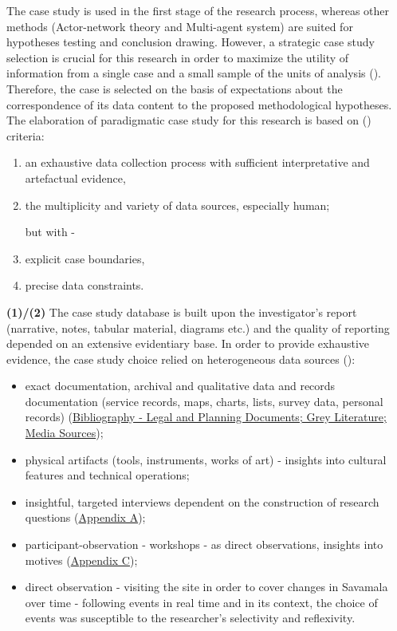 \documentclass[11pt]{report}
\begin{document}
The case study is used in the first stage of the research process, whereas other methods (Actor-network theory and Multi-agent system) are suited for hypotheses testing and conclusion drawing. However, a strategic case study selection is crucial for this research in order to maximize the utility of information from a single case and a small sample of the units of analysis  (\href{Flyvbjerg}{\citealt{flyvbjerg_five_2006}}).
Therefore, the case is selected on the basis of expectations about the correspondence of its data content to the proposed methodological hypotheses. The elaboration of paradigmatic case study for this research is based on (\href{Yin}{\citealt{yin_case_2009}}) criteria:

\begin{enumerate}
\item an exhaustive data collection process with sufficient interpretative and artefactual evidence,
\item the multiplicity and variety of data sources, especially human;

but with - 
\item explicit case boundaries,
\item precise data constraints.
\end{enumerate}

\textbf{(1)/(2) }The case study database is built upon the investigator’s report (narrative, notes, tabular material, diagrams etc.) and the quality  of reporting depended on an extensive evidentiary base. In order to provide exhaustive evidence, the case study choice relied on heterogeneous data sources (\href{Yin}{\citealt{yin_case_2003}}):

\begin{itemize}
\item exact documentation, archival and qualitative data and records documentation (service records, maps, charts, lists, survey data, personal records) (\href{Bibliography}{Bibliography - Legal and Planning Documents; Grey Literature; Media Sources});
\item physical artifacts (tools, instruments, works of art) - insights into cultural features and technical operations;
\item insightful, targeted interviews dependent  on the construction of research questions (\href{Appendix}{Appendix A});
\item participant-observation - workshops -  as direct observations, insights into motives (\href{Appendix}{Appendix C});
\item direct observation - visiting the site in order to cover changes in Savamala over time
- following events in real time and in its context, the choice of events was susceptible to the researcher’s selectivity and reflexivity.
\end{itemize}
\end{document}
